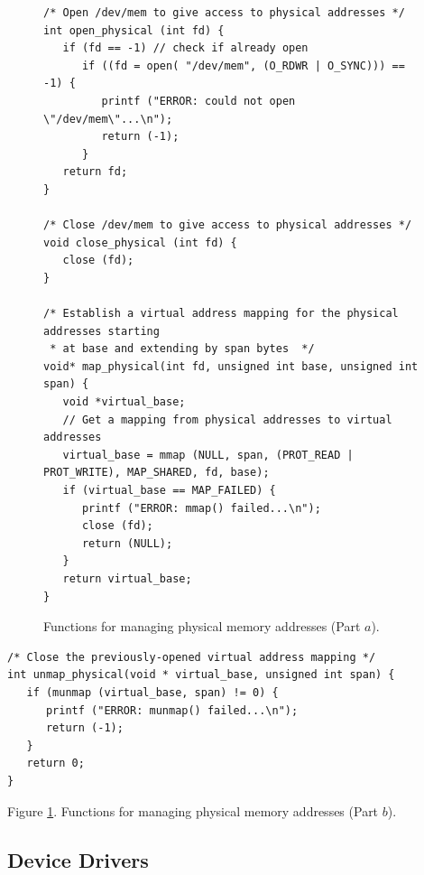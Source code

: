 \documentclass[11pt, twoside, pdftex]{article}
\begin{document}
\lstset{language=C,numbers=none}
\begin{figure}[H]
\begin{center}
\begin{minipage}[t]{16 cm}
\begin{lstlisting}
/* Open /dev/mem to give access to physical addresses */
int open_physical (int fd) {
   if (fd == -1) // check if already open
      if ((fd = open( "/dev/mem", (O_RDWR | O_SYNC))) == -1) {
         printf ("ERROR: could not open \"/dev/mem\"...\n");
         return (-1);
      }
   return fd;
}

/* Close /dev/mem to give access to physical addresses */
void close_physical (int fd) {
   close (fd);
}

/* Establish a virtual address mapping for the physical addresses starting 
 * at base and extending by span bytes  */
void* map_physical(int fd, unsigned int base, unsigned int span) {
   void *virtual_base;
   // Get a mapping from physical addresses to virtual addresses
   virtual_base = mmap (NULL, span, (PROT_READ | PROT_WRITE), MAP_SHARED, fd, base);
   if (virtual_base == MAP_FAILED) {
      printf ("ERROR: mmap() failed...\n");
      close (fd);
      return (NULL);
   }
   return virtual_base;
}
\end{lstlisting}
\end{minipage}
\end{center}
\vspace{-0.33in}\caption{Functions for managing physical memory addresses (Part $a$).}
\label{fig:functions}
\end{figure}

\lstset{language=C,numbers=none}
\begin{center}
\begin{minipage}[t]{15 cm}
\begin{lstlisting}
/* Close the previously-opened virtual address mapping */
int unmap_physical(void * virtual_base, unsigned int span) {
   if (munmap (virtual_base, span) != 0) {
      printf ("ERROR: munmap() failed...\n");
      return (-1);
   }
   return 0;
}
\end{lstlisting}
Figure \ref{fig:functions}. Functions for managing physical memory addresses (Part $b$).
\end{minipage}
\end{center}

\subsection{Device Drivers}
\label{sec:device_drivers}
\end{document}
